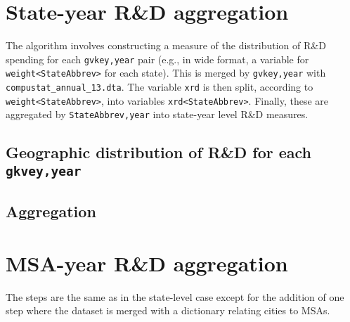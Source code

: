 \documentclass[12pt,english]{article}
\theoremstyle{remark}
\begin{document}
\section{State-year R\&D aggregation}\label{section_algorithm_state}

The algorithm involves constructing a measure of the distribution of R\&D spending for each \texttt{gvkey,year} pair (e.g., in wide format, a variable for \texttt{weight<StateAbbrev>} for each state). This is merged by \texttt{gvkey,year} with \texttt{compustat\_annual\_13.dta}. The variable \texttt{xrd} is then split, according to \texttt{weight<StateAbbrev>}, into variables \texttt{xrd<StateAbbrev>}. Finally, these are aggregated by \texttt{StateAbbrev,year} into state-year level R\&D measures. 

\subsection{Geographic distribution of R\&D for each \texttt{gkvey,year}}\label{subsection_RDdistribution_gvkeyyear}

\subsection{Aggregation}\label{subsection_aggregation_state}

\section{MSA-year R\&D aggregation}\label{section_algorithm_MSA}

The steps are the same as in the state-level case except for the addition of one step where the dataset is merged with a dictionary relating cities to MSAs. 
\end{document}
